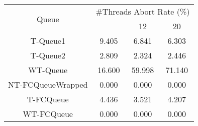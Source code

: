 \begin{tabular}{|c|c|c|c|}
\hline
\multirow{2}{*}{Queue} & \multicolumn{3}{c|}{\#Threads Abort Rate (\%)}\\\cline{2-4}& \quad 4 & 12 & 20\\
\hline
\hline
T-Queue1 & 9.405 & 6.841 & 6.303\\
T-Queue2 & 2.809 & 2.324 & 2.446\\
WT-Queue & 16.600 & 59.998 & 71.140\\
NT-FCQueueWrapped & 0.000 & 0.000 & 0.000\\
T-FCQueue & 4.436 & 3.521 & 4.207\\
WT-FCQueue & 0.000 & 0.000 & 0.000\\
\hline\end{tabular}
